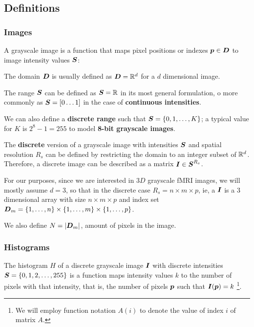 \subsection{Definitions}

\newcommand{\D}{\ve{D}}
\newcommand{\DM}{\D_m}
\newcommand{\V}{\ve{S}}

\subsubsection*{Images}

A grayscale image is a function that maps pixel positions or indexes $\pv \in \D$ to image intensity values $\V$:
 
\ma{
\fdef{I}{\D}{\V}
}

The domain $\D$ is usually defined as $\D=\reals^d$ for a $d$ dimensional image.

The range $\V$ can be defined as $\V=\reals$ in its most general formulation, o more commonly as $\V= [0 \dots 1]$ in the case of \textbf{continuous intensities}. 

We can also define a \textbf{discrete range} such that $\V=\{0,1,\dots,K\}$; a typical value for $K$ is $2^8-1=255$ to model \textbf{8-bit grayscale images}.

The \textbf{discrete} version of a grayscale image with intensities $\V$ and spatial resolution $R_s$ can be defined by restricting the domain to an integer subset of $\mathbb{R}^d$. Therefore, a discrete image can be described as a matrix $\I \in \V^{R_s}$.

For our purposes, since we are interested in $3D$ grayscale fMRI images, we will mostly assume $d=3$, so that in the discrete case $R_s= n \times m \times p$, ie, a $\boldsymbol{I}$ is a 3 dimensional array with size $n \times m \times p$ and index set $\DM= \{1,\dots,n\} \times \{1,\dots,m\} \times \{1,\dots,p\}$.

We also define $N=|\DM|$, amount of pixels in the image.

\subsubsection*{Histograms}

The histogram $H$ of a discrete grayscale image $\boldsymbol{I}$ with discrete intensities $\V=\{0,1,2,\dots,255\}$ is a function maps intensity values $k$ to the number of pixels with that intensity, that is, the number of pixels $\boldsymbol{p}$ such that $\boldsymbol{I}(\boldsymbol{p})=k$ \footnote{We will employ function notation $A(i)$ to denote the value of index $i$ of matrix $A$.}.


